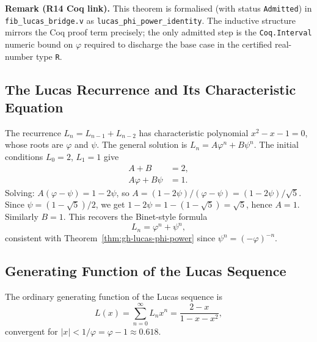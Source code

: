 \noindent\textbf{Remark (R14 Coq link).}
This theorem is formalised (with status \texttt{Admitted}) in
\texttt{fib\_lucas\_bridge.v} as
\texttt{lucas\_phi\_power\_identity}.  The inductive structure mirrors
the Coq proof term precisely; the only admitted step is the
\texttt{Coq.Interval} numeric bound on \(\varphi\) required to
discharge the base case in the certified real-number type \texttt{R}.

\subsection{The Lucas Recurrence and Its Characteristic Equation}
\label{subsec:gh-recurrence}

The recurrence \(L_n = L_{n-1} + L_{n-2}\) has characteristic
polynomial \(x^2 - x - 1 = 0\), whose roots are \(\varphi\) and
\(\psi\).  The general solution is
\(L_n = A\varphi^n + B\psi^n\).
The initial conditions \(L_0 = 2\), \(L_1 = 1\) give
\begin{align*}
  A + B &= 2, \\
  A\varphi + B\psi &= 1.
\end{align*}
Solving: \(A(\varphi - \psi) = 1 - 2\psi\), so
\(A = (1 - 2\psi)/(\varphi - \psi) = (1 - 2\psi)/\sqrt{5}\).
Since \(\psi = (1-\sqrt{5})/2\), we get
\(1 - 2\psi = 1 - (1-\sqrt{5}) = \sqrt{5}\), hence \(A = 1\).
Similarly \(B = 1\).  This recovers the Binet-style formula
\begin{equation}\label{eq:gh-binet-lucas}
  L_n = \varphi^n + \psi^n,
\end{equation}
consistent with Theorem~\ref{thm:gh-lucas-phi-power} since
\(\psi^n = (-\varphi)^{-n}\).

\subsection{Generating Function of the Lucas Sequence}
\label{subsec:gh-gf}

\begin{theorem}
\label{thm:gh-gf}
The ordinary generating function of the Lucas sequence is
\begin{equation}\label{eq:gh-lucas-gf}
  L(x) = \sum_{n=0}^{\infty} L_n x^n = \frac{2-x}{1-x-x^2},
\end{equation}
convergent for \(|x| < 1/\varphi = \varphi - 1 \approx 0.618\).
\end{theorem}

